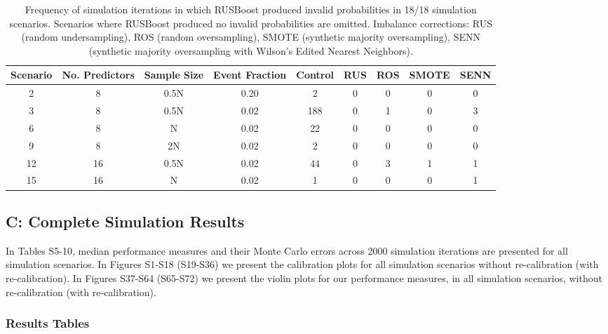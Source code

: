 \documentclass[
]{article}
\begin{document}
\begin{table}[!h]
\renewcommand\thetable{S4} 
\caption{\label{tab:S4} Frequency of simulation iterations in which RUSBoost produced invalid probabilities in 18/18 simulation scenarios. Scenarios where RUSBoost produced no invalid probabilities are omitted. Imbalance corrections: RUS (random undersampling), ROS (random oversampling), SMOTE (synthetic majority oversampling), SENN (synthetic majority oversampling with Wilson's Edited Nearest Neighbors).}
\centering
\begin{tabular}[t]{ccccccccc}
\toprule
Scenario & No. Predictors & Sample Size & Event Fraction & Control & RUS & ROS & SMOTE & SENN\\
\midrule
2 & 8 & 0.5N & 0.20 & 2 & 0 & 0 & 0 & 0\\
 
3 & 8 & 0.5N & 0.02 & 188 & 0 & 1 & 0 & 3\\
 
6 & 8 & N & 0.02 & 22 & 0 & 0 & 0 & 0\\
 
9 & 8 & 2N & 0.02 & 2 & 0 & 0 & 0 & 0\\
 
12 & 16 & 0.5N & 0.02 & 44 & 0 & 3 & 1 & 1\\
 
15 & 16 & N & 0.02 & 1 & 0 & 0 & 0 & 1\\
\bottomrule
\end{tabular}
\end{table}

\hypertarget{c-complete-simulation-results}{%
\subsection{C: Complete Simulation
Results~}\label{c-complete-simulation-results}}

In Tables S5-10, median performance measures and their Monte Carlo
errors across 2000 simulation iterations are presented for all
simulation scenarios. In Figures S1-S18 (S19-S36) we present the
calibration plots for all simulation scenarios without re-calibration
(with re-calibration). In Figures S37-S64 (S65-S72) we present the
violin plots for our performance measures, in all simulation scenarios,
without re-calibration (with re-calibration).

\hypertarget{results-tables}{%
\subsubsection{Results Tables}\label{results-tables}}
\end{document}
